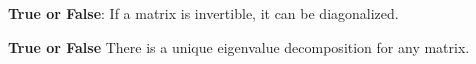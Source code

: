 \begin{enumerate}
\qitem \textbf{True or False}: If a matrix is invertible, it can be diagonalized. \\




\qitem \textbf{True or False} There is a unique eigenvalue decomposition for any matrix. \\




\end{enumerate}
